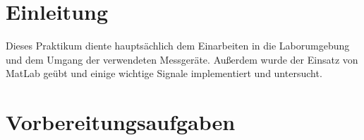 % 

\newcommand{\institut}{Institut f\"ur Telekommunikationssysteme}
\newcommand{\fachgebiet}{Nachrichten\"ubertragung}
\newcommand{\veranstaltung}{Praktikum Nachrichten\"ubertragung}
\newcommand{\pdfautor}{\"Ozg\"u Dogan (326 048), Boris Henckell (325 779)}
\newcommand{\autor}{\"Ozg\"u Dogan (326 048)\\ Boris Henckell (325 779)}
\newcommand{\gruppe}{Gruppe: }


\newcommand{\pdftitle}{Nachrichten\"ubertragung\ Praktikum\ 01}
\newcommand{\prototitle}{Praktikum 01 \\ Einf\"uhrung in MATLAB}




\section{Einleitung}

Dieses Praktikum diente hauptsächlich dem Einarbeiten in die Laborumgebung und
dem Umgang der verwendeten Messger\"ate. Außerdem wurde der Einsatz von MatLab
geübt und einige wichtige Signale implementiert und untersucht.


\section{Vorbereitungsaufgaben}

